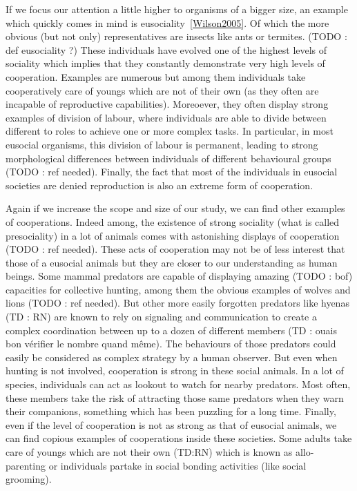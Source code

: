     If we focus our attention a little higher to organisms of a bigger size, an example which quickly comes in mind is eusociality~\ref{Wilson2005}. Of which the more obvious (but not only) representatives are insects like ants or termites. (TODO : def eusociality ?) These individuals have evolved one of the highest levels of sociality which implies that they constantly demonstrate very high levels of cooperation. Examples are numerous but among them individuals take cooperatively care of youngs which are not of their own (as they often are incapable of reproductive capabilities). Moreoever, they often display strong examples of division of labour, where individuals are able to divide between different to roles to achieve one or more complex tasks. In particular, in most eusocial organisms, this division of labour is permanent, leading to strong morphological differences between individuals of different behavioural groups (TODO : ref needed). Finally, the fact that most of the individuals in eusocial societies are denied reproduction is also an extreme form of cooperation.


    Again if we increase the scope and size of our study, we can find other examples of cooperations. Indeed among, the existence of strong sociality (what is called presociality) in a lot of animals comes with astonishing displays of cooperation (TODO : ref needed). These acts of cooperation may not be of less interest that those of a eusocial animals but they are closer to our understanding as human beings. Some mammal predators are capable of displaying amazing (TODO : bof) capacities for collective hunting, among them the obvious examples of wolves and lions (TODO : ref needed). But other more easily forgotten predators like hyenas (TD : RN) are known to rely on signaling and communication to create a complex coordination between up to a dozen of different members (TD : ouais bon vérifier le nombre quand même). The behaviours of those predators could easily be considered as complex strategy by a human observer. But even when hunting is not involved, cooperation is strong in these social animals. In a lot of species, individuals can act as lookout to watch for nearby predators. Most often, these members take the risk of attracting those same predators when they warn their companions, something which has been puzzling for a long time. Finally, even if the level of cooperation is not as strong as that of eusocial animals, we can find copious examples of cooperations inside these societies. Some adults take care of youngs which are not their own (TD:RN) which is known as allo-parenting or individuals partake in social bonding activities (like social grooming).

